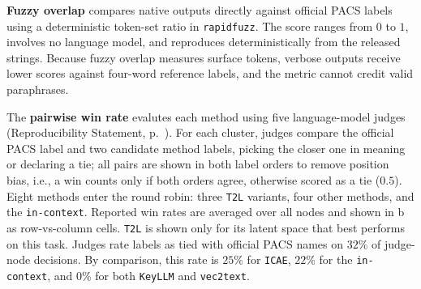 \textbf{Fuzzy overlap} compares native outputs directly against official PACS labels using a deterministic token-set ratio in \texttt{rapidfuzz}.
The score ranges from $0$ to $1$, involves no language model, and reproduces deterministically from the released strings.
Because fuzzy overlap measures surface tokens, verbose outputs receive lower scores against four-word reference labels, and the metric cannot credit valid paraphrases.

The \textbf{pairwise win rate} evalutes each method using five language-model judges (Reproducibility Statement, p.~\pageref{sec:repro}). For each cluster, judges compare the official PACS label and two candidate method labels, picking the closer one in meaning or declaring a tie; all pairs are shown in both label orders to remove position bias, i.e., a win counts only if both orders agree, otherwise scored as a tie ($0.5$). 
Eight methods enter the round robin: three \texttt{T2L} variants, four other methods, and the \texttt{in-context}. Reported win rates are averaged over all nodes and shown in b as row-vs-column cells. \texttt{T2L} is shown only for its latent space that best performs on this task. 
Judges rate \doctolora labels as tied with official PACS names on $32\%$ of judge-node decisions.
By comparison, this rate is $25\%$ for \texttt{ICAE}, $22\%$ for the \texttt{in-context}, and $0\%$ for both \texttt{KeyLLM} and \texttt{vec2text}.


